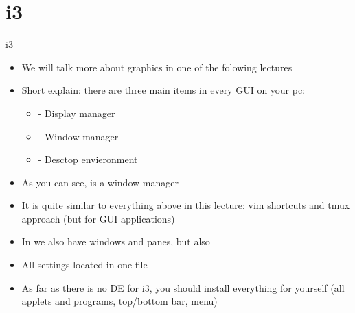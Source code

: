 \documentclass[usenames,dvipsnames,10pt,aspectratio=169]{beamer}
\begin{document}
\section{i3}
\begin{frame}{i3}
    \begin{itemize}
        \item We will talk more about graphics in one of the folowing lectures
        \item Short explain: there are three main items in every GUI on your pc:
        \begin{itemize}
            \item {} - Display manager
            \item {} - Window manager
            \item {} - Desctop envieronment
        \end{itemize}
        \item As you can see,  is a window manager
        \item It is quite similar to everything above in this lecture: vim shortcuts and tmux approach (but for GUI applications)
        \item In  we also have windows and panes, but also 
        \item All settings located in one file - 
        \item As far as there is no DE for i3, you should install everything for yourself (all applets and programs, top/bottom bar, menu)
    \end{itemize}
\end{frame}

\end{document}
